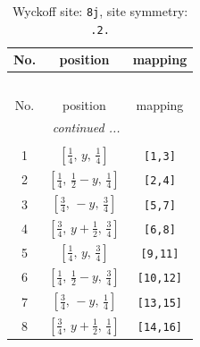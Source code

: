 \documentclass[fleqn,8pt]{jsarticle}
\begin{document}
\begin{longtable}{ccc}
\caption{Wyckoff site: {\tt 8j}, site symmetry: {\tt .2.}}
 \\
 \hline \hline
No. & position & mapping \\ \hline \endfirsthead

\multicolumn{2}{l}{\tablename\ \thetable{}} \\
 \hline \hline
No. & position & mapping \\ \hline \endhead

 \hline \hline
\multicolumn{2}{r}{\footnotesize\it continued ...} \\ \endfoot

 \hline \hline
\multicolumn{2}{r}{} \\ \endlastfoot

1 & $\left[ \frac{1}{4},\, y,\, \frac{1}{4} \right]$ & {\tt [1,3]} \\ \hline
2 & $\left[ \frac{1}{4},\, \frac{1}{2} - y,\, \frac{1}{4} \right]$ & {\tt [2,4]} \\ \hline
3 & $\left[ \frac{3}{4},\, - y,\, \frac{3}{4} \right]$ & {\tt [5,7]} \\ \hline
4 & $\left[ \frac{3}{4},\, y + \frac{1}{2},\, \frac{3}{4} \right]$ & {\tt [6,8]} \\ \hline
5 & $\left[ \frac{1}{4},\, y,\, \frac{3}{4} \right]$ & {\tt [9,11]} \\ \hline
6 & $\left[ \frac{1}{4},\, \frac{1}{2} - y,\, \frac{3}{4} \right]$ & {\tt [10,12]} \\ \hline
7 & $\left[ \frac{3}{4},\, - y,\, \frac{1}{4} \right]$ & {\tt [13,15]} \\ \hline
8 & $\left[ \frac{3}{4},\, y + \frac{1}{2},\, \frac{1}{4} \right]$ & {\tt [14,16]} \\
\end{longtable}
\renewcommand{\arraystretch}{1.2}
\end{document}
